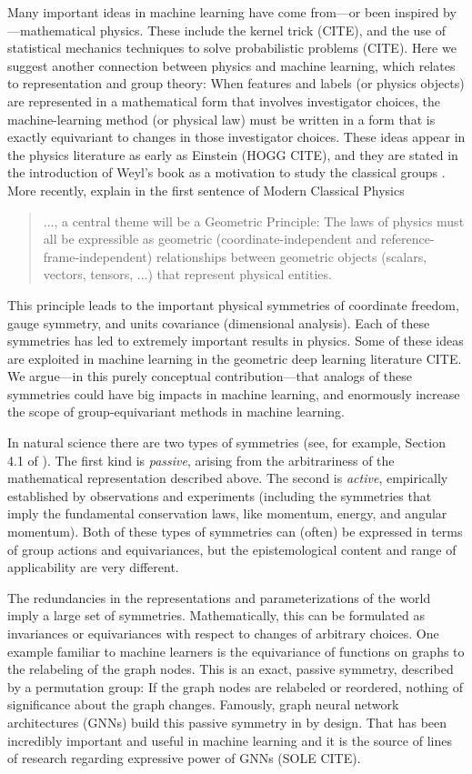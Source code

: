 \documentclass{article}
\theoremstyle{plain}
\theoremstyle{definition}
\theoremstyle{remark}
\begin{document}
Many important ideas in machine learning have come from---or been inspired by---mathematical physics.
These include the kernel trick (CITE), and the use of statistical mechanics techniques to solve probabilistic problems (CITE).
Here we suggest another connection between physics and machine learning, which relates to representation and group theory:
When features and labels (or physics objects) are represented in a mathematical form that involves investigator choices, the machine-learning method (or physical law) must be written in a form that is exactly equivariant to changes in those investigator choices.
These ideas appear in the physics literature as early as Einstein (HOGG CITE), and they are stated in the introduction of Weyl's book as a motivation to study the classical groups \cite{weyl}. More recently, \citealt{mcp} explain in the first sentence of Modern Classical Physics  
\begin{quote}
..., a central theme will be a Geometric Principle: The laws of physics must all
be expressible as geometric (coordinate-independent and reference-frame-independent)
relationships between geometric objects (scalars, vectors, tensors, ...) that represent
physical entities.
\end{quote}
This principle leads to the important physical symmetries of coordinate freedom, gauge symmetry, and units covariance (dimensional analysis).
Each of these symmetries has led to extremely important results in physics. Some of these ideas are exploited in machine learning in the geometric deep learning literature CITE. 
We argue---in this purely conceptual contribution---that analogs of these symmetries could have big impacts in machine learning, and enormously increase the scope of group-equivariant methods in machine learning.

In natural science there are two types of symmetries (see, for example, Section 4.1 of \cite{rovelli2000loop}). 
The first kind is \emph{passive}, arising from the arbitrariness of the mathematical representation described above.
The second is \emph{active}, empirically established by observations and experiments (including the symmetries that imply the fundamental conservation laws, like momentum, energy, and angular momentum).
Both of these types of symmetries can (often) be expressed in terms of group actions and equivariances, but the epistemological content and range of applicability are very different. 

The redundancies in the representations and parameterizations of the world imply a large set of symmetries.
Mathematically, this can be formulated as invariances or equivariances with respect to changes of arbitrary choices.
One example familiar to machine learners is the equivariance of functions on graphs to the relabeling of the graph nodes.
This is an exact, passive symmetry, described by a permutation group:
If the graph nodes are relabeled or reordered, nothing of significance about the graph changes.
Famously, graph neural network architectures (GNNs) build this passive symmetry in by design.
That has been incredibly important and useful in machine learning and it is the source of lines of research regarding expressive power of GNNs (SOLE CITE).
\end{document}
